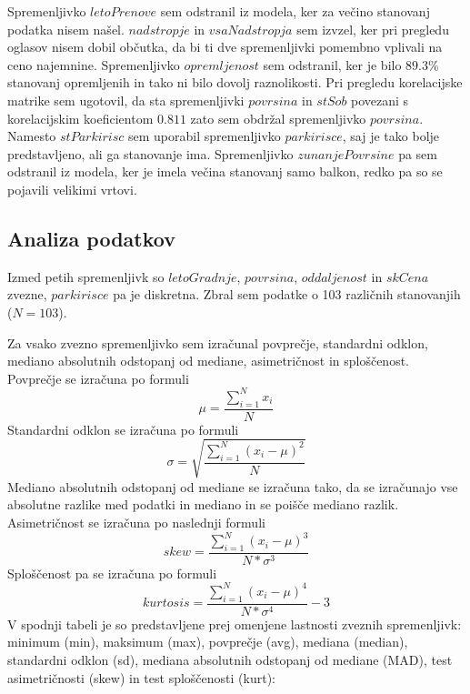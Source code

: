 \documentclass[a4paper, 12pt]{article}
\begin{document}
Spremenljivko $ letoPrenove $ sem odstranil iz modela, ker za večino
stanovanj podatka nisem našel. $ nadstropje $ in $ vsaNadstropja $
sem izvzel, ker pri pregledu oglasov nisem dobil občutka, da bi ti dve
spremenljivki pomembno vplivali na ceno najemnine. Spremenljivko
$ opremljenost $ sem odstranil, ker je bilo $ 89.3\% $ stanovanj
opremljenih in tako ni bilo dovolj raznolikosti. Pri pregledu korelacijske
matrike sem ugotovil, da sta spremenljivki $ povrsina $ in
$ stSob $ povezani s korelacijskim koeficientom $ 0.811 $ zato sem obdržal
spremenljivko $ povrsina $. Namesto $ stParkirisc $ sem uporabil
spremenljivko $ parkirisce $, saj je tako bolje predstavljeno, ali ga
stanovanje ima. Spremenljivko $ zunanjePovrsine $ pa sem  odstranil iz
modela, ker je imela večina stanovanj samo balkon, redko pa so se pojavili
velikimi vrtovi.

\subsection{Analiza podatkov}

Izmed petih spremenljivk so $ letoGradnje $, $ povrsina $,
$ oddaljenost $ in $ skCena $ zvezne, $ parkirisce $ pa je
diskretna. Zbral sem podatke o 103 različnih stanovanjih ($ N = 103 $).

Za vsako zvezno spremenljivko sem izračunal povprečje, standardni odklon,
mediano absolutnih odstopanj od mediane, asimetričnost in sploščenost.
Povprečje se izračuna po formuli
\begin{equation}
	\mu = \frac{\sum\limits_{i=1}^{N} x_{i}}{N}
\end{equation}
Standardni odklon se izračuna po formuli
\begin{equation}
	\sigma = \sqrt{\frac{\sum\limits_{i=1}^{N}\left(x_{i}-\mu\right)^{2}}{N}}
\end{equation}
Mediano absolutnih odstopanj od mediane se izračuna tako, da se izračunajo vse
absolutne razlike med podatki in mediano in se poišče mediano razlik.
\newline
Asimetričnost se izračuna po naslednji formuli
\begin{equation}
	skew = \frac{\sum\limits_{i=1}^{N}\left(x_{i}-\mu\right)^{3}}{N*\sigma^{3}}
\end{equation}
Sploščenost pa se izračuna po formuli
\begin{equation}
	kurtosis = \frac{\sum\limits_{i=1}^{N}\left(x_{i}-\mu\right)^{4}}{N*\sigma^{4}}-3
\end{equation}
\newline
V spodnji tabeli je so predstavljene prej omenjene lastnosti zveznih
spremenljivk: minimum (min), maksimum (max), povprečje (avg), mediana (median),
standardni odklon (sd), mediana absolutnih odstopanj od mediane (MAD), test
asimetričnosti (skew) in test sploščenosti (kurt):
\end{document}
